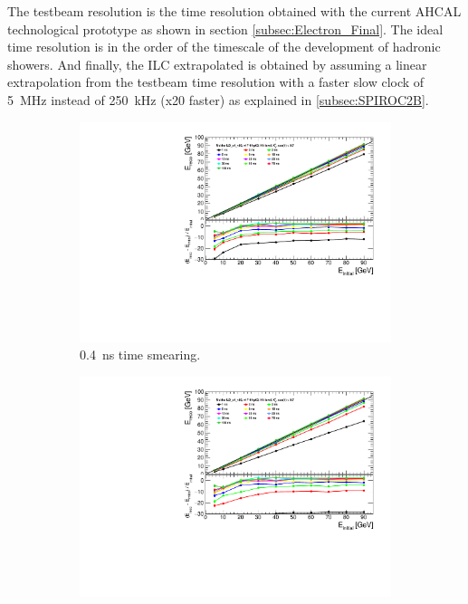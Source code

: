 The testbeam resolution is the time resolution obtained with the current AHCAL technological prototype as shown in section \ref{subsec:Electron_Final}. The ideal time resolution is in the order of the timescale of the development of hadronic showers. And finally, the ILC extrapolated is obtained by assuming a linear extrapolation from the testbeam time resolution with a faster slow clock of \SI{5}{\mega\hertz} instead of \SI{250}{\kilo\hertz} (x20 faster) as explained in \ref{subsec:SPIROC2B}.\\

\begin{figure}[htbp!]
  \centering
  \begin{subfigure}[t]{0.48\textwidth}
    \centering
    \includegraphics[width=1\linewidth]{../Thesis_Plots/ILD/Smearing_0.4ns/Plots/Linearity_TimeCuts_Smearing1}
    \caption{\SI{0.4}{\nano\second} time smearing.} \label{fig:Lin0.4ns}
  \end{subfigure}
  \begin{subfigure}[t]{0.48\textwidth}
    \centering
    \includegraphics[width=1\linewidth]{../Thesis_Plots/ILD/Smearing_1ns/Plots/Linearity_TimeCuts_Smearing2}

\end{subfigure}
\end{figure}
